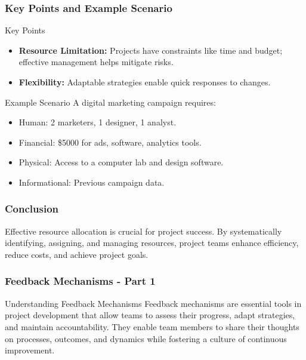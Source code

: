 \documentclass[aspectratio=169]{beamer}
\begin{document}
\begin{frame}[fragile]
    \frametitle{Key Points and Example Scenario}
    \begin{block}{Key Points}
        \begin{itemize}
            \item \textbf{Resource Limitation:} Projects have constraints like time and budget; effective management helps mitigate risks.
            \item \textbf{Flexibility:} Adaptable strategies enable quick responses to changes.
        \end{itemize}
    \end{block}

    \begin{block}{Example Scenario}
        A digital marketing campaign requires:
        \begin{itemize}
            \item Human: 2 marketers, 1 designer, 1 analyst.
            \item Financial: \$5000 for ads, software, analytics tools.
            \item Physical: Access to a computer lab and design software.
            \item Informational: Previous campaign data.
        \end{itemize}
    \end{block}
\end{frame}

\begin{frame}[fragile]
    \frametitle{Conclusion}
    Effective resource allocation is crucial for project success. 
    By systematically identifying, assigning, and managing resources, project teams enhance efficiency, reduce costs, and achieve project goals.
\end{frame}

\begin{frame}[fragile]
    \frametitle{Feedback Mechanisms - Part 1}
    \begin{block}{Understanding Feedback Mechanisms}
        Feedback mechanisms are essential tools in project development that allow teams to assess their progress, adapt strategies, and maintain accountability. 
        They enable team members to share their thoughts on processes, outcomes, and dynamics while fostering a culture of continuous improvement.
    \end{block}
\end{frame}
\end{document}
